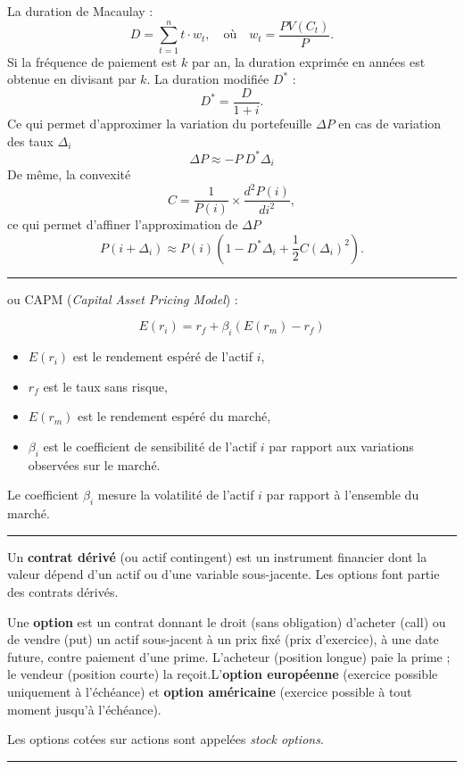 \begin{f}

La duration de Macaulay :
\[ 		
D = \sum_{t=1}^{n} t \cdot w_t, \quad \text{où} \quad w_t = \frac{PV(C_t)}{P}.
 \]	
Si la fréquence de paiement est $k$ par an, la duration exprimée en années est obtenue en divisant par $k$.
La duration modifiée $D^*$  :
\[ 	
D^* = \frac{D}{1 + i}.
 \]
 Ce qui permet d'approximer la variation du portefeuille $\Delta P$ en cas de variation des taux $\Delta_i$
\[ 
\Delta P \approx -P\ D^* \Delta_i 
 \]
De même, la convexité
\[ 	
C = \frac{1}{P(i)} \times \frac{d^2 P(i)}{di^2},
 \]
 ce qui permet d’affiner l'approximation de $\Delta P$
\[ 	
P(i + \Delta_i) \approx P(i) \left( 1 -D^*\Delta_i + \frac{1}{2} C (\Delta_i)^2 \right).
 \]
\end{f}
\hrule



\begin{f}[MEDAF]
  ou CAPM (\textit{Capital Asset Pricing Model})  :

\[
E(r_i) = r_f + \beta_i (E(r_m) - r_f)
\]

\begin{itemize}
    \item \( E(r_i) \) est le rendement espéré de l'actif \( i \),
    \item \( r_f \) est le taux sans risque,
    \item \( E(r_m) \) est le rendement espéré du marché,
    \item \( \beta_i \) est le coefficient de sensibilité de l'actif \( i \) par rapport aux variations observées sur le marché.
\end{itemize}

Le coefficient \( \beta_i \) mesure la volatilité de l'actif \( i \) par rapport à l'ensemble du marché. 

\end{f}
\hrule


\begin{f}

Un \textbf{contrat dérivé} (ou actif contingent) est un instrument financier dont la valeur dépend d’un actif ou d’une variable sous-jacente. Les options font partie des contrats dérivés.


Une \textbf{option} est un contrat donnant le droit (sans obligation) d’acheter (call) ou de vendre (put) un actif sous-jacent à un prix fixé (prix d’exercice), à une date future, contre paiement d’une prime. 
L’acheteur (position longue) paie la prime ; le vendeur (position courte) la reçoit.L'\textbf{option européenne}  (exercice possible uniquement à l’échéance) et   
 \textbf{option américaine} (exercice possible à tout moment jusqu’à l’échéance).

Les options cotées sur actions sont appelées \textit{stock options}.

\end{f}
\hrule


